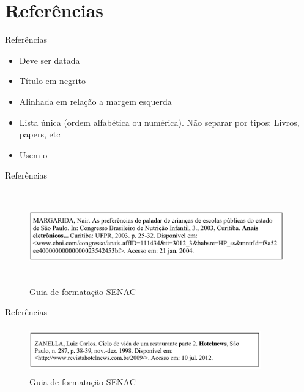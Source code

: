 \section{Referências}

\begin{frame}	
	\begin{block}{Referências}	
		\begin{itemize}
			\item Deve ser datada
			\item Título em negrito
			\item Alinhada em relação a margem esquerda
			\item Lista única (ordem alfabética ou numérica). Não separar por tipos: Livros, papers, etc 
			\item Usem o \href{http://www.more.ufsc.br/}{\color{blue}{MORE}} 
		\end{itemize}
	\end{block}
\end{frame}

\begin{frame}	
	\begin{block}{Referências}	
		 \begin{figure}[!htb]
			\centering	  				
			\includegraphics[height=4cm, width = 11cm]{./pic/referencias/trabalhoeventodigital.png}
			\caption{Guia de formatação SENAC \cite{GUIA_SENAC}}
			\label{fig_referencia01}
		\end{figure}
	\end{block}
\end{frame}

\begin{frame}	
	\begin{block}{Referências}	
		 \begin{figure}[!htb]
			\centering	  				
			\includegraphics[height=2cm, width = 10cm]{./pic/referencias/artigorevistadigital.png}
			\caption{Guia de formatação SENAC \cite{GUIA_SENAC}}
			\label{fig_referencia02}
		\end{figure}
	\end{block}
\end{frame}

